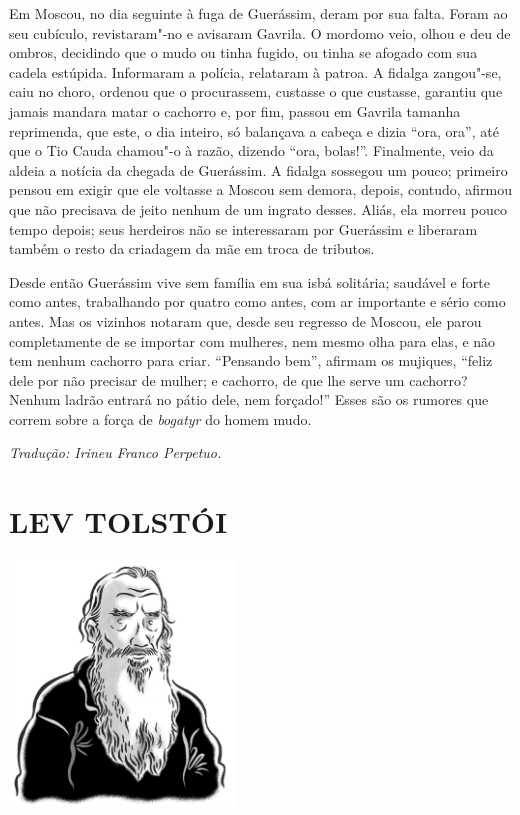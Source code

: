 Em Moscou, no dia seguinte à fuga de Guerássim, deram por sua falta.
Foram ao seu cubículo, revistaram"-no e avisaram Gavrila. O mordomo veio,
olhou e deu de ombros, decidindo que o mudo ou tinha fugido, ou tinha se
afogado com sua cadela estúpida. Informaram a polícia, relataram à
patroa. A fidalga zangou"-se, caiu no choro, ordenou que o procurassem,
custasse o que custasse, garantiu que jamais mandara matar o cachorro e,
por fim, passou em Gavrila tamanha reprimenda, que este, o dia inteiro,
só balançava a cabeça e dizia ``ora, ora'', até que o Tio Cauda chamou"-o
à razão, dizendo ``ora, bolas!''. Finalmente, veio da aldeia a notícia
da chegada de Guerássim. A fidalga sossegou um pouco; primeiro pensou em
exigir que ele voltasse a Moscou sem demora, depois, contudo, afirmou
que não precisava de jeito nenhum de um ingrato desses. Aliás, ela
morreu pouco tempo depois; seus herdeiros não se interessaram por
Guerássim e liberaram também o resto da criadagem da mãe em troca de
tributos.

Desde então Guerássim vive sem família em sua isbá solitária; saudável e
forte como antes, trabalhando por quatro como antes, com ar importante e
sério como antes. Mas os vizinhos notaram que, desde seu regresso de
Moscou, ele parou completamente de se importar com mulheres, nem mesmo
olha para elas, e não tem nenhum cachorro para criar. ``Pensando bem'',
afirmam os mujiques, ``feliz dele por não precisar de mulher; e
cachorro, de que lhe serve um cachorro? Nenhum ladrão entrará no pátio
dele, nem forçado!'' Esses são os rumores que correm sobre a força de
\emph{bogatyr} do homem mudo. \enlargethispage{\baselineskip}


{\footnotesize\hfill\emph{Tradução: Irineu Franco Perpetuo.}}


\part[LEV TOLSTÓI]{LEV TOLSTÓI }

\pagebreak
\thispagestyle{empty}
\mbox{}
\vfill
\begin{center}
\includegraphics[width=6cm]{./imgs/autor4.jpg}
\end{center}


